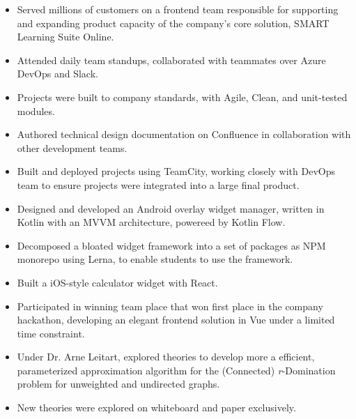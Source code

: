 \documentclass[11pt, a4paper]{article}
\begin{document}
\noindent
{
  \hfill
}
\vspace{-0.08in}
\begin{itemize}
  \item Served millions of customers on a frontend team responsible for supporting and expanding product capacity of the company's core solution, SMART Learning Suite Online.
        \vspace{-0.1in}
  \item Attended daily team standups, collaborated with teammates over Azure DevOps and Slack.
        \vspace{-0.1in}
  \item Projects were built to company standards, with Agile, Clean, and unit-tested modules.
        \vspace{-0.1in}
  \item Authored technical design documentation on Confluence in collaboration with other development teams.
        \vspace{-0.1in}
  \item Built and deployed projects using TeamCity, working closely with DevOps team to ensure projects were integrated into a large final product.
        \vspace{-0.1in}
  \item Designed and developed an Android overlay widget manager, written in Kotlin with an MVVM architecture, powereed by Kotlin Flow.
        \vspace{-0.1in}
  \item Decomposed a bloated widget framework into a set of packages as NPM monorepo using Lerna, to enable students to use the framework.
        \vspace{-0.1in}
  \item Built a iOS-style calculator widget with React.
        \vspace{-0.1in}
  \item Participated in winning team place that won first place in the company hackathon, developing an elegant frontend solution in Vue under a limited time constraint.
\end{itemize}
\vspace{-0.05in}

\noindent
{
  \hfill
}

\noindent
{
  \hfill
}
\vspace{-0.08in}
\begin{itemize}
  \item Under Dr. Arne Leitart, explored theories to develop more a efficient, parameterized
        approximation algorithm for the (Connected) {\it r}-Domination problem for unweighted
        and undirected graphs.
        \vspace{-0.1in}
  \item New theories were explored on whiteboard and paper exclusively.
\end{itemize}
\vspace{-0.05in}
\end{document}
